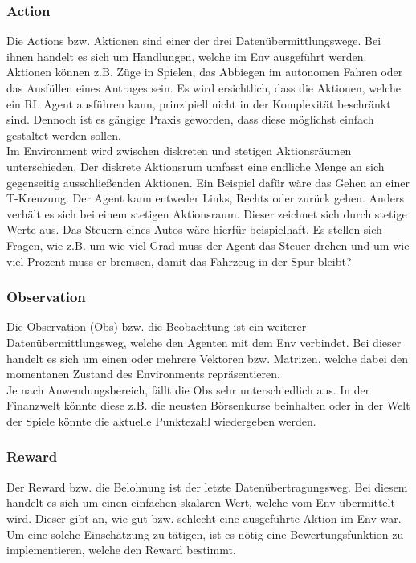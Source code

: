 \subsubsection{Action} \label{subsubsec:Grundlagen_Action}
Die Actions bzw. Aktionen sind einer der drei Datenübermittlungswege. Bei ihnen handelt es sich um Handlungen, welche im Env ausgeführt werden. Aktionen können z.B. Züge in Spielen, das Abbiegen im autonomen Fahren oder das Ausfüllen eines Antrages sein. Es wird ersichtlich, dass die Aktionen, welche ein RL Agent ausführen kann, prinzipiell nicht in der Komplexität beschränkt sind. 
Dennoch ist es gängige Praxis geworden, dass diese möglichst einfach gestaltet werden sollen.\\
Im Environment wird zwischen diskreten und stetigen Aktionsräumen unterschieden. Der diskrete Aktionsrum umfasst eine endliche Menge an sich gegenseitig ausschließenden Aktionen. Ein Beispiel dafür wäre das Gehen an einer T-Kreuzung. Der Agent kann entweder Links, Rechts oder zurück gehen.
Anders verhält es sich bei einem stetigen Aktionsraum. Dieser zeichnet sich durch stetige Werte aus. Das Steuern eines Autos wäre hierfür beispielhaft. Es stellen sich Fragen, wie z.B. um wie viel Grad muss der Agent das Steuer drehen und um wie viel Prozent muss er bremsen, damit das Fahrzeug in der Spur bleibt? \citep[S. 31 f.]{DRL_Lapan}

\subsubsection{Observation} \label{subsubsec:Grundlagen_Observation}
Die Observation (Obs) bzw. die Beobachtung ist ein weiterer Datenübermittlungsweg, welche den Agenten mit dem Env verbindet. Bei dieser handelt es sich um einen oder mehrere Vektoren bzw. Matrizen, welche dabei den momentanen Zustand des Environments repräsentieren. \citep[S. 381]{Sutton1998}\\
Je nach Anwendungsbereich, fällt die Obs sehr unterschiedlich aus. In der Finanzwelt könnte diese z.B. die neusten Börsenkurse beinhalten oder in der Welt der Spiele könnte die aktuelle Punktezahl wiedergeben werden. \citep[S. 32]{DRL_Lapan}

\subsubsection{Reward} \label{subsubsec:Grundlagen_Reward}
Der Reward bzw. die Belohnung ist der letzte Datenübertragungsweg.
Bei diesem handelt es sich um einen einfachen skalaren Wert, welche vom Env übermittelt wird. Dieser gibt an, wie gut bzw. schlecht eine ausgeführte Aktion im Env war. \citep[S. 42]{Sutton1998}\\
Um eine solche Einschätzung zu tätigen, ist es nötig eine Bewertungsfunktion zu implementieren, welche den Reward bestimmt.


